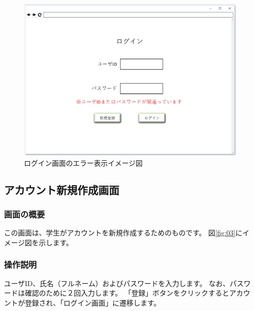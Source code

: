 \begin{figure}[phtbp]
  \begin{center}
    \includegraphics[width=1\linewidth,clip]{./img/02.png}
    \caption{ログイン画面のエラー表示イメージ図}\label{fig:02}
  \end{center}
\end{figure}

\newpage

\subsection{アカウント新規作成画面\label{creat_account}}
\subsubsection{画面の概要}
この画面は、学生がアカウントを新規作成するためのものです。
図\ref{fig:03}にイメージ図を示します。

\subsubsection{操作説明}
ユーザID、氏名（フルネーム）およびパスワードを入力します。
なお、パスワードは確認のために２回入力します。
「登録」ボタンをクリックするとアカウントが登録され、「ログイン画面」に遷移します。

